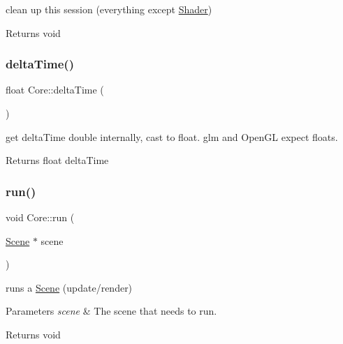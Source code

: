 clean up this session (everything except \hyperlink{class_shader}{Shader}) 

\begin{DoxyReturn}{Returns}
void 
\end{DoxyReturn}
\mbox{\label{class_core_aa10de2c3cab1440c1ee1b1daba0ba3b4}} 
\subsubsection{\texorpdfstring{delta\+Time()}{deltaTime()}}
{\footnotesize\ttfamily float Core\+::delta\+Time (\begin{DoxyParamCaption}{ }\end{DoxyParamCaption})\hspace{0.3cm}{\ttfamily [inline]}}



get delta\+Time double internally, cast to float. glm and Open\+GL expect floats. 

\begin{DoxyReturn}{Returns}
float delta\+Time 
\end{DoxyReturn}
\mbox{\label{class_core_aae9e07e9a6ff17ee4d2b5c46858515ab}} 
\subsubsection{\texorpdfstring{run()}{run()}}
{\footnotesize\ttfamily void Core\+::run (\begin{DoxyParamCaption}\item[{\hyperlink{class_scene}{Scene} $\ast$}]{scene }\end{DoxyParamCaption})}



runs a \hyperlink{class_scene}{Scene} (update/render) 


\begin{DoxyParams}{Parameters}
{\em scene} & The scene that needs to \textquotesingle{}run\textquotesingle{}. \\
\hline
\end{DoxyParams}
\begin{DoxyReturn}{Returns}
void 
\end{DoxyReturn}
\mbox{\label{class_core_a82f4706b062ad65b24445bdf6fd6573c}} 
